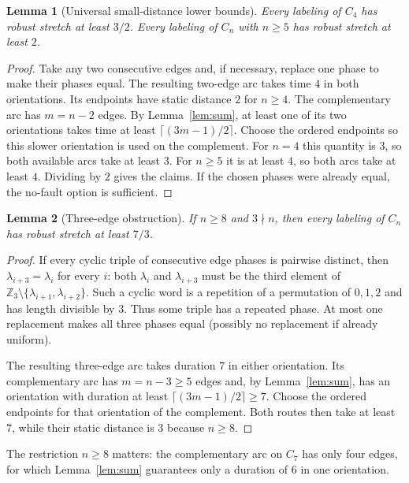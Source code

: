 \documentclass[11pt,a4paper]{article}
\newtheorem{lemma}{Lemma}
\newcommand{\Z}{\mathbb Z}
\begin{document}
\begin{lemma}[Universal small-distance lower bounds]\label{lem:lower2}
Every labeling of $C_4$ has robust stretch at least $3/2$. Every labeling of $C_n$ with $n\ge5$ has robust stretch at least $2$.
\end{lemma}
\begin{proof}
Take any two consecutive edges and, if necessary, replace one phase to make their phases equal. The resulting two-edge arc takes time $4$ in both orientations. Its endpoints have static distance $2$ for $n\ge4$. The complementary arc has $m=n-2$ edges. By Lemma~\ref{lem:sum}, at least one of its two orientations takes time at least $\lceil(3m-1)/2\rceil$. Choose the ordered endpoints so this slower orientation is used on the complement. For $n=4$ this quantity is $3$, so both available arcs take at least $3$. For $n\ge5$ it is at least $4$, so both arcs take at least $4$. Dividing by $2$ gives the claims. If the chosen phases were already equal, the no-fault option is sufficient.
\end{proof}

\begin{lemma}[Three-edge obstruction]\label{lem:lower73}
If $n\ge8$ and $3\nmid n$, then every labeling of $C_n$ has robust stretch at least $7/3$.
\end{lemma}
\begin{proof}
If every cyclic triple of consecutive edge phases is pairwise distinct, then $\lambda_{i+3}=\lambda_i$ for every $i$: both $\lambda_i$ and $\lambda_{i+3}$ must be the third element of $\Z_3\setminus\{\lambda_{i+1},\lambda_{i+2}\}$. Such a cyclic word is a repetition of a permutation of $0,1,2$ and has length divisible by $3$. Thus some triple has a repeated phase. At most one replacement makes all three phases equal (possibly no replacement if already uniform).

The resulting three-edge arc takes duration $7$ in either orientation. Its complementary arc has $m=n-3\ge5$ edges and, by Lemma~\ref{lem:sum}, has an orientation with duration at least $\lceil(3m-1)/2\rceil\ge7$. Choose the ordered endpoints for that orientation of the complement. Both routes then take at least $7$, while their static distance is $3$ because $n\ge8$.
\end{proof}
The restriction $n\ge8$ matters: the complementary arc on $C_7$ has only four edges, for which Lemma~\ref{lem:sum} guarantees only a duration of $6$ in one orientation.
\end{document}
